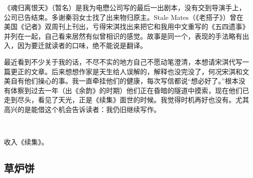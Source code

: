 \par 《魂归离恨天》（暂名）是我为电懋公司写的最后一出剧本，没有交到导演手上，公司已告结束。多谢秦羽女士找了出来物归原主。Stale Mates（《老搭子》）曾在美国《记者》双周刊上刊出，亏得宋淇找出来把它和我用中文重写的《五四遗事》并列在一起，自己看来居然有似曾相识的感觉。故事是同一个，表现的手法略有出入，因为要迁就读者的口味，绝不能说是翻译。
\par 最近看到不少关于我的话，不尽不实的地方自己不愿动笔澄清，本想请宋淇代写一篇更正的文章。后来想想作家是天生给人误解的，解释也没完没了，何况宋淇和文美自有他们操心的事。我一直牵挂他们的健康，每次写信都说“想必好了。”根本没有体察到过去一年（出《余韵》的时期）他们正在昏暗的隧道中摸索，现在他们已走到尽头，看见了天光，正是《续集》面世的时候。我觉得时机再好也没有。尤其高兴的是能借这个机会告诉读者：我仍旧继续写作。
\par  
\par *收入《续集》。



\subsection{草炉饼}


